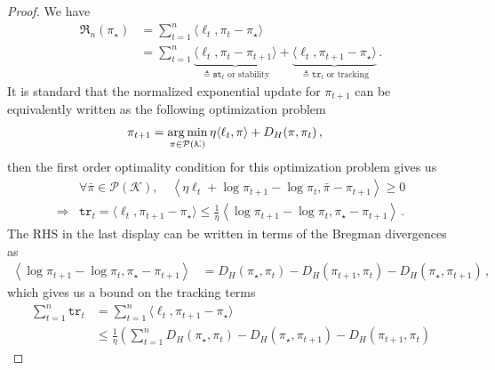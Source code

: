 \documentclass{article}
\theoremstyle{plain}
\theoremstyle{definition}
\theoremstyle{plain}
\newcommand{\argmin}{\operatornamewithlimits{arg\,min}}
\newcommand{\Reg}{\mathfrak{R}}
\newcommand{\K}{\mathcal K}
\newcommand{\cP}{\mathcal P}
\begin{document}
\begin{proof}
    We have
    \begin{align}
        \Reg_n(\pi_\star)
         & =
        \sum_{t=1}^{n} \langle \ell_t, \pi_t - \pi_\star \rangle \\
         & =
        \sum_{t=1}^{n}
        \underbrace{\langle \ell_t, \pi_t - \pi_{t+1} \rangle}_{\triangleq \texttt{st}_t \text{ or stability}}
        +
        \underbrace{\langle \ell_t, \pi_{t+1} - \pi_\star \rangle}_{\triangleq \texttt{tr}_t \text{ or tracking}}\,.
    \end{align}
    It is standard that the normalized exponential update for $\pi_{t+1}$ can be equivalently written as the following optimization problem
    \begin{align}
        \pi_{t+1}
         & =
        \argmin_{\pi \in \cP(\K)}
        \eta \langle \ell_t, \pi \rangle + D_H(\pi,\pi_t)\,,
    \end{align}
    then the first order optimality condition for this optimization problem gives us
    \begin{align}
         & \forall \bar{\pi} \in \cP(\K), \quad
        \left\langle
        \eta \ell_t + \log \pi_{t+1} - \log \pi_t,
        \bar{\pi} - \pi_{t+1}
        \right\rangle
        \geq 0                                  \\
        \Rightarrow
         &
        \texttt{tr}_t
        =
        \langle \ell_t, \pi_{t+1} - \pi_\star \rangle
        \leq
        \frac{1}{\eta}
        \left\langle
        \log \pi_{t+1} - \log \pi_t,
        \pi_\star - \pi_{t+1}
        \right\rangle\,.
    \end{align}
    The RHS in the last display can be written in terms of the Bregman divergences as
    \begin{align}
        \left\langle
        \log \pi_{t+1} - \log \pi_t,
        \pi_\star - \pi_{t+1}
        \right\rangle
         & =
        D_H(\pi_\star, \pi_t)
        -
        D_H(\pi_{t+1}, \pi_t)
        -
        D_H(\pi_\star, \pi_{t+1})\,,
    \end{align}
    which gives us a bound on the tracking terms
    \begin{align}
        \sum_{t=1}^{n} \texttt{tr}_t
         & =
        \sum_{t=1}^{n}
        \langle \ell_t, \pi_{t+1} - \pi_\star \rangle \\
         & \leq
        \frac{1}{\eta}
        \left(
        \sum_{t=1}^{n}
        D_H(\pi_\star, \pi_t)
        -
        D_H(\pi_\star, \pi_{t+1})
        -
        D_H(\pi_{t+1}, \pi_t)

\end{align}
\end{proof}
\end{document}
